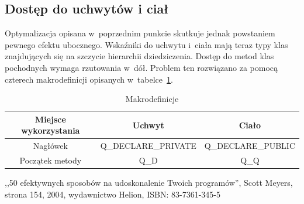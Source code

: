 \documentclass[11pt,twoside,a4paper,final]{llncs}
\begin{document}
\subsection{Dostęp do uchwytów i ciał}
Optymalizacja opisana w~poprzednim punkcie skutkuje jednak powstaniem pewnego efektu ubocznego.
Wskaźniki do uchwytu i~ciała mają teraz typy klas znajdujących się na szczycie hierarchii dziedziczenia. Dostęp do metod klas pochodnych wymaga rzutowania w~dół. 
Problem ten rozwiązano za pomocą czterech makrodefinicji opisanych w~tabelce~\ref{tab:makra}.


\begin{table}[h]\footnotesize
  	\caption{Makrodefinicje}
	\label{tab:makra}
	\begin{tabular}{|c|c|c|}
	\hline
	Miejsce wykorzystania & Uchwyt & Ciało\\
	\hline
	Nagłówek & Q\_DECLARE\_PRIVATE & Q\_DECLARE\_PUBLIC\\
	\hline
	Początek metody & Q\_D & Q\_Q\\
	\hline
	\end{tabular}
\end{table}

\begin{thebibliography}{}
,,50 efektywnych sposobów na udoskonalenie Twoich programów'', Scott Meyers, strona 154, 2004, wydawnictwo Helion, ISBN: 83-7361-345-5


\end{thebibliography}
\end{document}
